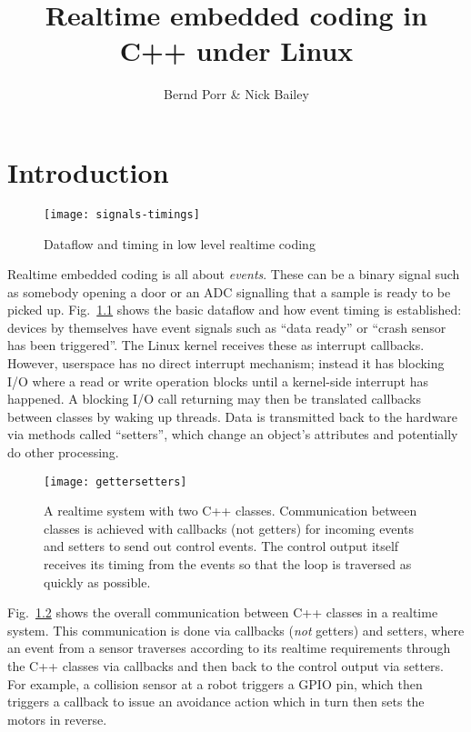 \documentclass[12pt]{report}
\author{Bernd Porr \& Nick Bailey}
\title{Realtime embedded coding in C++ under Linux}
\begin{document}
\maketitle

\tableofcontents

\chapter{Introduction}



\begin{figure}[!hbt]
\begin{center}
\mbox{\texttt{[image: signals-timings]}}
\end{center}
\caption{Dataflow and timing in low level realtime coding
\label{timing}}
\end{figure}

Realtime embedded coding is all about \textsl{events}.
These can be a binary signal such as somebody opening a door or
an ADC signalling that a sample is ready to be picked up.
Fig.~\ref{timing} shows the basic dataflow and how event timing is
established: devices by themselves have event signals such as ``data
ready'' or ``crash sensor has been triggered''. The Linux kernel receives
these as interrupt callbacks. However, userspace has no direct interrupt
mechanism; instead it has blocking I/O where a read or write operation blocks
until a kernel-side interrupt has happened. A blocking I/O call returning
may then be translated callbacks between classes by waking up threads.
Data is transmitted back to the hardware via methods called ``setters'',
which change an object's attributes and potentially do other processing.

\begin{figure}[!hbt]
\begin{center}
\mbox{\texttt{[image: gettersetters]}}
\end{center}
\caption{A realtime system with two C++ classes. Communication
  between classes is achieved with callbacks (not getters) for incoming events
  and setters to send out control events. The control output itself
  receives its timing from the events so that the loop is traversed
  as quickly as possible.
\label{gettersetters}}
\end{figure}
Fig.~\ref{gettersetters} shows the overall communication between C++
classes in a realtime system. This communication is done via callbacks
(\textsl{not} getters) and setters, where an event from a sensor
traverses according to its realtime requirements through the C++ classes via
callbacks and then back to the control output via setters. For example,
a collision sensor at a robot triggers a GPIO pin, which then triggers a
callback to issue an avoidance action which in turn then sets the
motors in reverse.
\end{document}
